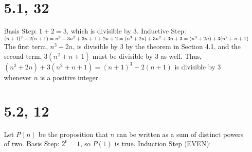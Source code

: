 \documentclass{article}
\begin{document}
\section{5.1, 32}
Basis Step: $1 + 2 = 3$, which is divisible by 3.
\newline
Inductive Step:
\newline
$(n + 1)^3 + 2(n + 1)
\newline
= n^3 + 3n^2 + 3n + 1 + 2n + 2
\newline
= (n^3 + 2n) + 3n^2 + 3n + 3
\newline
= (n^3 + 2n) + 3(n^2 + n + 1)$
\newline
The first term, $n^3 + 2n$, is divisible by 3 by the theorem in Section 4.1, and the second term, $3(n^2 + n + 1)$ must be divisible by 3 as well. Thus, $(n^3 + 2n) + 3(n^2 + n + 1) = (n + 1)^3 + 2(n + 1)$ is divisible by 3 whenever $n$ is a positive integer.

\section{5.2, 12}
Let $P(n)$ be the proposition that $n$ can be written as a sum of distinct powers of two.
\newline
Basis Step: $2^0 = 1$, so $P(1)$ is true.
\newline
Induction Step (EVEN):
\newline
\end{document}
